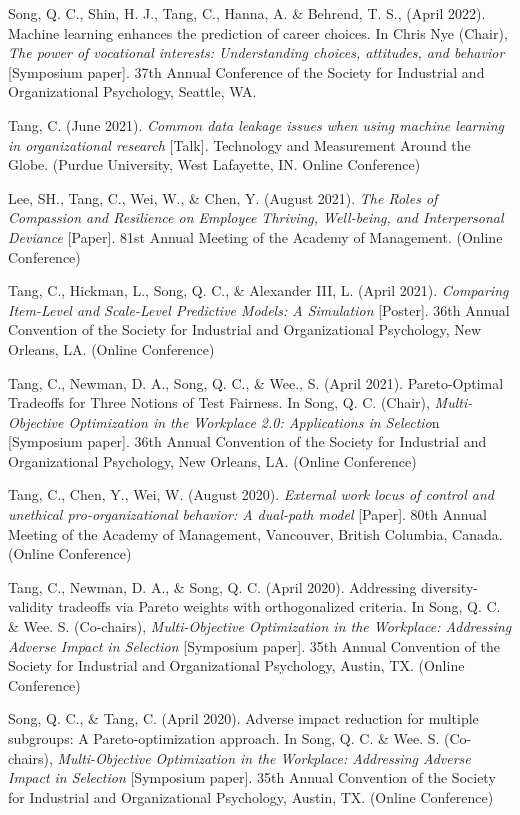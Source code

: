 \documentclass[
  20,
]{article}
\begin{document}
Song, Q. C., Shin, H. J., Tang, C., Hanna, A. \& Behrend, T. S., (April
2022). Machine learning enhances the prediction of career choices. In
Chris Nye (Chair), \emph{The power of vocational interests:
Understanding choices, attitudes, and behavior} {[}Symposium paper{]}.
37th Annual Conference of the Society for Industrial and Organizational
Psychology, Seattle, WA.

Tang, C. (June 2021). \emph{Common data leakage issues when using
machine learning in organizational research} {[}Talk{]}. Technology and
Measurement Around the Globe. (Purdue University, West Lafayette, IN.
Online Conference)

Lee, SH., Tang, C., Wei, W., \& Chen, Y. (August 2021). \emph{The Roles
of Compassion and Resilience on Employee Thriving, Well-being, and
Interpersonal Deviance} {[}Paper{]}. 81st Annual Meeting of the Academy
of Management. (Online Conference)

Tang, C., Hickman, L., Song, Q. C., \& Alexander III, L. (April 2021).
\emph{Comparing Item-Level and Scale-Level Predictive Models: A
Simulation} {[}Poster{]}. 36th Annual Convention of the Society for
Industrial and Organizational Psychology, New Orleans, LA. (Online
Conference)

Tang, C., Newman, D. A., Song, Q. C., \& Wee., S. (April 2021).
Pareto-Optimal Tradeoffs for Three Notions of Test Fairness. In Song, Q.
C. (Chair), \emph{Multi-Objective Optimization in the Workplace 2.0:
Applications in Selectio}n {[}Symposium paper{]}. 36th Annual Convention
of the Society for Industrial and Organizational Psychology, New
Orleans, LA. (Online Conference)

Tang, C., Chen, Y., Wei, W. (August 2020). \emph{External work locus of
control and unethical pro-organizational behavior: A dual-path model}
{[}Paper{]}. 80th Annual Meeting of the Academy of Management,
Vancouver, British Columbia, Canada. (Online Conference)

Tang, C., Newman, D. A., \& Song, Q. C. (April 2020). Addressing
diversity-validity tradeoffs via Pareto weights with orthogonalized
criteria. In Song, Q. C. \& Wee. S. (Co-chairs), \emph{Multi-Objective
Optimization in the Workplace: Addressing Adverse Impact in Selection}
{[}Symposium paper{]}. 35th Annual Convention of the Society for
Industrial and Organizational Psychology, Austin, TX. (Online
Conference)

Song, Q. C., \& Tang, C. (April 2020). Adverse impact reduction for
multiple subgroups: A Pareto-optimization approach. In Song, Q. C. \&
Wee. S. (Co-chairs), \emph{Multi-Objective Optimization in the
Workplace: Addressing Adverse Impact in Selection} {[}Symposium
paper{]}. 35th Annual Convention of the Society for Industrial and
Organizational Psychology, Austin, TX. (Online Conference)
\end{document}

